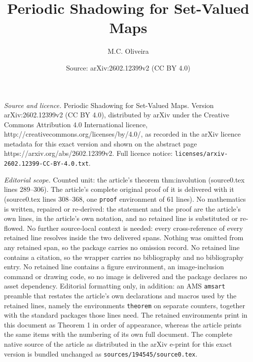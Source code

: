 \documentclass[10pt,a4paper]{amsart}
\title{Periodic Shadowing for Set-Valued Maps}
\author{M.C. Oliveira}
\date{Source: arXiv:2602.12399v2 (CC BY 4.0)}
\begin{document}
\maketitle

\noindent\emph{Source and licence.} Periodic Shadowing for Set-Valued Maps. Version arXiv:2602.12399v2 (CC BY 4.0), distributed by arXiv under the Creative Commons Attribution 4.0 International licence, http://creativecommons.org/licenses/by/4.0/, as recorded in the arXiv licence metadata for this exact version and shown on the abstract page https://arxiv.org/abs/2602.12399v2. Full licence notice: \texttt{licenses/arxiv-2602.12399-CC-BY-4.0.txt}.\par\smallskip

\noindent\textit{Editorial scope.} Counted unit: the article's theorem thm:involution (source0.tex lines 289--306). The article's complete original proof of it is delivered with it (source0.tex lines 308--368, one \texttt{proof} environment of 61 lines). No mathematics is written, repaired or re-derived: the statement and the proof are the article's own lines, in the article's own notation, and no retained line is substituted or re-flowed.  No further source-local context is needed: every cross-reference of every retained line resolves inside the two delivered spans.  Nothing was omitted from any retained span, so the package carries no omission record.  No retained line contains a citation, so the wrapper carries no bibliography and no bibliography entry.  No retained line contains a figure environment, an image-inclusion command or drawing code, so no image is delivered and the package declares no asset dependency.  Editorial formatting only, in addition: an AMS \texttt{amsart} preamble that restates the article's own declarations and macros used by the retained lines, namely the environments \texttt{theorem} on separate counters, together with the standard packages those lines need.  The retained environments print in this document as Theorem 1 in order of appearance, whereas the article prints the same items with the numbering of its own full document.  The complete native source of the article as distributed in the arXiv e-print for this exact version is bundled unchanged as \texttt{sources/194545/source0.tex}.
\end{document}
